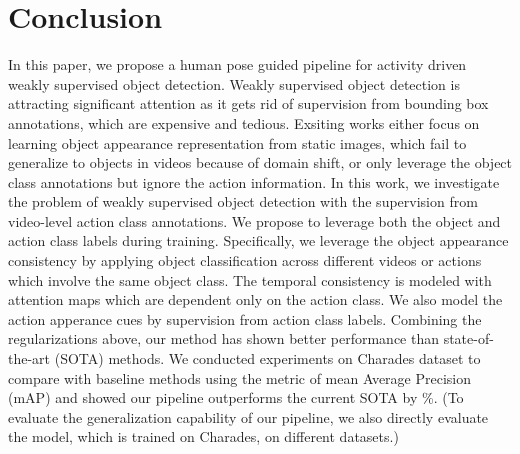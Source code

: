 \section{Conclusion}
In this paper, we propose a human pose guided pipeline for activity driven weakly supervised object detection.
Weakly supervised object detection is attracting significant attention as it gets rid of supervision from bounding box annotations, which are expensive and tedious. Exsiting works either focus on learning object appearance representation from static images, which fail to generalize to objects in videos because of domain shift, or only leverage the object class annotations but ignore the action information. In this work, we investigate the problem of weakly supervised object detection with the supervision from video-level action class annotations. We propose to leverage both the object and action class labels during training. Specifically, we leverage the object appearance consistency by applying object classification across different videos or actions which involve the same object class. The temporal consistency is modeled with attention maps which are dependent only on the action class. We also model the action apperance cues by supervision from action class labels. Combining the regularizations above, our method has shown better performance than state-of-the-art (SOTA) methods. We conducted experiments on Charades dataset to compare with baseline methods using the metric of mean Average Precision (mAP) and showed our pipeline outperforms the current SOTA by \%. (To evaluate the generalization capability of our pipeline, we also directly evaluate the model, which is trained on Charades, on different datasets.)